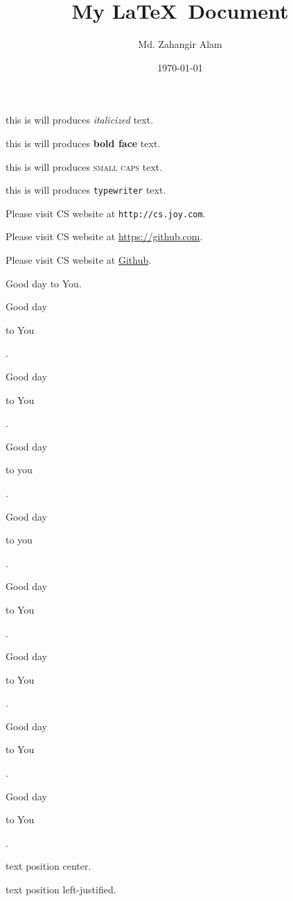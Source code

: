 \documentclass[11pt]{article}
\title{My \LaTeX\ Document}
\author{Md. Zahangir Alam}
\date{\today}
\begin{document}
\tableofcontents
\maketitle

this is will produces \textit{italicized} text.

this is will produces \textbf{bold face} text.

this is will produces \textsc{small caps} text.

this is will produces \texttt{typewriter} text.

Please visit CS website at \texttt{http://cs.joy.com}.

Please visit CS website at \url{https://github.com}.

Please visit CS website at \href{https://github.com}{Github}.

\vspace{1cm}
Good day to You.

Good day \begin{large}to You\end{large}.

Good day \begin{Large}to You\end{Large}.

Good day \begin{huge}to you\end{huge}.

Good day \begin{Huge}to you\end{Huge}.


Good day \begin{normalsize}to You\end{normalsize}.


Good day \begin{small}to You\end{small}.

Good day \begin{scriptsize}to You\end{scriptsize}.

Good day \begin{tiny}to You\end{tiny}.


\vspace{1cm}
\begin{center}text position center.\end{center}

\begin{flushleft}text position left-justified.\end{flushleft}
\end{document}

